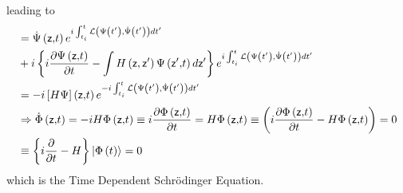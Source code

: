 \documentclass[aps,preprint]{revtex4}
\begin{document}
leading to%
\begin{align}
& =\dot{\Psi}\left( \mathsf{z,}t\right) e^{i\int_{t_{i}}^{t}\mathcal{L}%
\left( \Psi\left( t^{\prime}\right) ,\dot{\Psi}\left( t^{\prime}\right)
\right) dt^{\prime}}  \notag \\
& +i\left\{ i\frac{\partial\Psi\left( \mathsf{z,}t\right) }{\partial t}-\int
H\left( \mathsf{z,z}^{\prime}\right) \Psi\left( \mathsf{z}^{\prime }\mathsf{,%
}t\right) d\mathsf{z}^{\prime}\right\} e^{i\int_{t_{i}}^{t}\mathcal{L}\left(
\Psi\left( t^{\prime}\right) ,\dot{\Psi}\left( t^{\prime}\right) \right)
dt^{\prime}}  \notag \\
& =-i\left[ H\Psi\right] \left( \mathsf{z,}t\right) e^{-i\int_{t_{i}}^{t}%
\mathcal{L}\left( \Psi\left( t^{\prime}\right) ,\dot{\Psi}\left(
t^{\prime}\right) \right) dt^{\prime}}  \notag \\
& \Rightarrow\dot{\Phi}\left( \mathsf{z,}t\right) =-iH\Phi\left( \mathsf{z,}%
t\right) \equiv i\frac{\partial\Phi\left( \mathsf{z,}t\right) }{\partial t}%
=H\Phi\left( \mathsf{z,}t\right) \equiv\left( i\frac {\partial\Phi\left( 
\mathsf{z,}t\right) }{\partial t}-H\Phi\left( \mathsf{z,}t\right) \right) =0
\notag \\
& \equiv\left\{ i\frac{\partial}{\partial t}-H\right\} \left| \Phi\left(
t\right) \right\rangle =0  \label{SE}
\end{align}
which is the Time Dependent Schr\"{o}dinger Equation.
\end{document}
